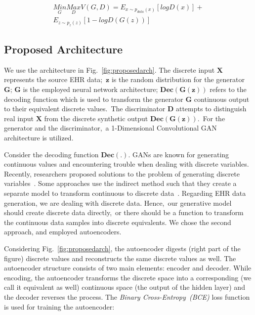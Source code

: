 \documentclass[letterpaper]{article} \usepackage{aaai20}  \usepackage{times}  \usepackage{helvet} \usepackage{courier}  \usepackage[hyphens]{url}  \usepackage{graphicx} \urlstyle{rm} \def\UrlFont{\rm}  \usepackage{graphicx}  \frenchspacing  \setlength{\pdfpagewidth}{8.5in}  \setlength{\pdfpageheight}{11in}
\begin{document}
\begin{equation}\label{eq:GAN}
\begin{split}
\underset{G}{Min}\underset{D}{Max}V(G,D) = E_{x\sim p_{data}(x)}[logD(x)] + \\ E_{z\sim p_{z}(z)}[1-logD(G(z))]
\end{split}
\end{equation}

\subsection{Proposed Architecture}\label{sec:Methodsub:ProposedArchitecture}

We use the architecture in Fig.~\ref{fig:proposedarch}.
The discrete input $\boldsymbol{X}$ represents the source EHR data;~$\boldsymbol{z}$ is the random distribution for the generator $\boldsymbol{G}$; $\boldsymbol{G}$ is the employed neural network architecture; $\boldsymbol{Dec(G(z))}$ refers to the decoding function which is used to transform the generator $\boldsymbol{G}$ continuous output to their equivalent discrete values.~The discriminator $\boldsymbol{D}$ attempts to distinguish real input $\boldsymbol{X}$ from the discrete synthetic output $\boldsymbol{Dec(G(z))}$.~For the generator and the discriminator,~a 1-Dimensional Convolutional GAN architecture is utilized.

Consider the decoding function $\boldsymbol{Dec(.)}$.
GANs are known for generating continuous values and encountering trouble when dealing with discrete variables.
Recently, researchers proposed solutions to the problem of generating discrete variables~\cite{hjelm2017boundary,wang2017irgan,kim2017adversarially,yu2017seqgan}.
Some approaches use the indirect method such that they create a separate model to transform continuous to discrete data~\cite{choi2017generating}.
Regarding EHR data generation, we are dealing with discrete data.
Hence,~our generative model should create discrete data directly,~or there should be a function to transform the continuous data samples into discrete equivalents.
We chose the second approach, and employed autoencoders.

Considering Fig.~\ref{fig:proposedarch}, the autoencoder digests (right part of the figure) discrete values and reconstructs the same discrete values as well.
The autoencoder structure consists of two main elements: encoder and decoder.
While encoding, the autoencoder transforms the discrete space into a corresponding (we call it equivalent as well) continuous space (the output of the hidden layer) and the decoder reverses the process.
The \textit{Binary Cross-Entropy~(BCE)} loss function is used for training the autoencoder:
\end{document}

